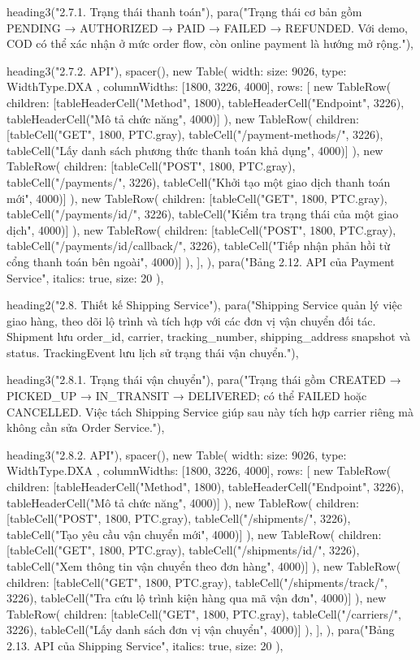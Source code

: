   heading3("2.7.1. Trạng thái thanh toán"),
  para("Trạng thái cơ bản gồm PENDING → AUTHORIZED → PAID → FAILED → REFUNDED. Với demo, COD có thể xác nhận ở mức order flow, còn online payment là hướng mở rộng."),

  heading3("2.7.2. API"),
  spacer(),
  new Table({
    width: { size: 9026, type: WidthType.DXA },
    columnWidths: [1800, 3226, 4000],
    rows: [
      new TableRow({ children: [tableHeaderCell("Method", 1800), tableHeaderCell("Endpoint", 3226), tableHeaderCell("Mô tả chức năng", 4000)] }),
      new TableRow({ children: [tableCell("GET", 1800, PTC.gray), tableCell("/payment-methods/", 3226), tableCell("Lấy danh sách phương thức thanh toán khả dụng", 4000)] }),
      new TableRow({ children: [tableCell("POST", 1800, PTC.gray), tableCell("/payments/", 3226), tableCell("Khởi tạo một giao dịch thanh toán mới", 4000)] }),
      new TableRow({ children: [tableCell("GET", 1800, PTC.gray), tableCell("/payments/{id}/", 3226), tableCell("Kiểm tra trạng thái của một giao dịch", 4000)] }),
      new TableRow({ children: [tableCell("POST", 1800, PTC.gray), tableCell("/payments/{id}/callback/", 3226), tableCell("Tiếp nhận phản hồi từ cổng thanh toán bên ngoài", 4000)] }),
    ],
  }),
  para("Bảng 2.12. API của Payment Service", { italics: true, size: 20 }),

  heading2("2.8. Thiết kế Shipping Service"),
  para("Shipping Service quản lý việc giao hàng, theo dõi lộ trình và tích hợp với các đơn vị vận chuyển đối tác. Shipment lưu order_id, carrier, tracking_number, shipping_address snapshot và status. TrackingEvent lưu lịch sử trạng thái vận chuyển."),

  heading3("2.8.1. Trạng thái vận chuyển"),
  para("Trạng thái gồm CREATED → PICKED_UP → IN_TRANSIT → DELIVERED; có thể FAILED hoặc CANCELLED. Việc tách Shipping Service giúp sau này tích hợp carrier riêng mà không cần sửa Order Service."),

  heading3("2.8.2. API"),
  spacer(),
  new Table({
    width: { size: 9026, type: WidthType.DXA },
    columnWidths: [1800, 3226, 4000],
    rows: [
      new TableRow({ children: [tableHeaderCell("Method", 1800), tableHeaderCell("Endpoint", 3226), tableHeaderCell("Mô tả chức năng", 4000)] }),
      new TableRow({ children: [tableCell("POST", 1800, PTC.gray), tableCell("/shipments/", 3226), tableCell("Tạo yêu cầu vận chuyển mới", 4000)] }),
      new TableRow({ children: [tableCell("GET", 1800, PTC.gray), tableCell("/shipments/{id}/", 3226), tableCell("Xem thông tin vận chuyển theo đơn hàng", 4000)] }),
      new TableRow({ children: [tableCell("GET", 1800, PTC.gray), tableCell("/shipments/track/", 3226), tableCell("Tra cứu lộ trình kiện hàng qua mã vận đơn", 4000)] }),
      new TableRow({ children: [tableCell("GET", 1800, PTC.gray), tableCell("/carriers/", 3226), tableCell("Lấy danh sách đơn vị vận chuyển", 4000)] }),
    ],
  }),
  para("Bảng 2.13. API của Shipping Service", { italics: true, size: 20 }),

